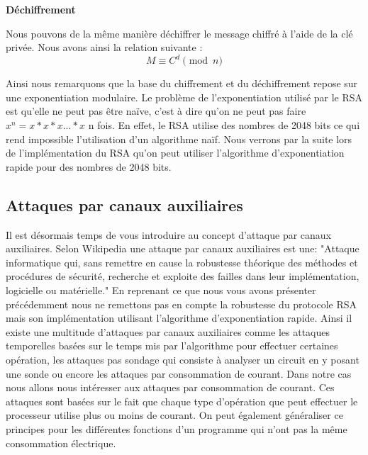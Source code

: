 \textbf{Déchiffrement}


Nous pouvons de la même manière déchiffrer le message chiffré à l'aide de la clé privée. 
Nous avons ainsi la relation suivante :
\begin{equation}
\label{eq:dechiffrement}
M \equiv C^d \pmod{n}
\end{equation}


Ainsi nous remarquons que la base du chiffrement et du déchiffrement repose sur une exponentiation modulaire. Le problème de l'exponentiation utilisé par le RSA est qu'elle ne peut pas être naïve, c'est à dire qu'on ne peut pas faire $ x^n = x*x*x...*x$ n fois. En effet, le RSA utilise des nombres de 2048 bits ce qui rend impossible l'utilisation d'un algorithme naïf.
Nous verrons par la suite lors de l'implémentation du RSA qu'on peut utiliser l'algorithme d'exponentiation rapide pour des nombres de 2048 bits.
\newpage
\subsection{Attaques par canaux auxiliaires}
Il est désormais temps de vous introduire au concept d'attaque par canaux auxiliaires.
Selon Wikipedia une attaque par canaux auxiliaires est une:
"Attaque informatique qui, sans remettre en cause la robustesse théorique des méthodes et procédures de sécurité, recherche et exploite des failles dans leur implémentation, logicielle ou matérielle."
En reprenant ce que nous vous avons présenter précédemment nous ne remettons pas en compte la robustesse du protocole RSA mais son implémentation utilisant l'algorithme d’exponentiation rapide.
Ainsi il existe une multitude d'attaques par canaux auxiliaires comme les attaques temporelles basées sur le temps mis par l'algorithme pour effectuer certaines opération, les attaques pas sondage qui consiste à analyser un circuit en y posant une sonde ou encore les attaques par consommation de courant.
Dans notre cas nous allons nous intéresser aux attaques par consommation de courant. Ces attaques sont basées sur le fait que chaque type d'opération que peut effectuer le processeur utilise plus ou moins de courant. On peut également généraliser ce principes pour les différentes fonctions d'un programme qui n'ont pas la même consommation électrique.


